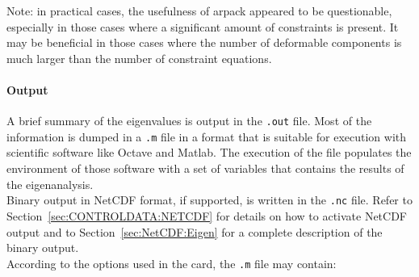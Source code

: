 Note: in practical cases, the usefulness of arpack appeared
to be questionable, especially in those cases where a significant amount
of constraints is present.
It may be beneficial in those cases where the number of deformable components
is much larger than the number of constraint equations.

\paragraph{Output}
A brief summary of the eigenvalues is output in the \texttt{.out} file.
Most of the information is dumped in a \texttt{.m} file in a format
that is suitable for execution with scientific software like
Octave and Matlab. The execution of the file populates the environment 
of those software with a set of variables that contains the results 
of the eigenanalysis. \\ 
Binary output in NetCDF format, if supported, is written in the 
\texttt{.nc} file. Refer to Section~\ref{sec:CONTROLDATA:NETCDF} 
for details on how to activate NetCDF output and to 
Section~\ref{sec:NetCDF:Eigen} for a complete description of the 
binary output. \\
According to the options used in the 
 card,
the \texttt{.m} file may contain:
